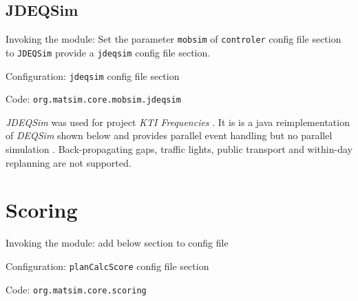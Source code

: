 \subsection{JDEQSim}
\label{sec:jdeqsim}
\begin{compactitem}
\item Invoking the module: Set the parameter \lstinline|mobsim| of \lstinline|controler| config file section to \lstinline|JDEQSim| provide a \lstinline|jdeqsim| config file section.
\item Configuration: \lstinline|jdeqsim| config file section
\item Code: \lstinline|org.matsim.core.mobsim.jdeqsim|
\end{compactitem}

\emph{JDEQSim} \citep[][]{WaraichEtAl_TechRep_IVT_2009, WaraichEtAl_STRC_2009} was used for project \emph{KTI Frequencies} \citep[][]{BalmerEtAl_ResRep_datapuls_2010}. It is is a java reimplementation of \emph{DEQSim} shown below \citep[][]{WaraichEtAl_STRC_2009, CharyparEtAl_TRR_2007, CharyparEtAl_TRB_2009} and provides parallel event handling but no parallel simulation \citep[][p.11]{BalmerEtAl_ResRep_datapuls_2010}. Back-propagating gaps, traffic lights, public transport and within-day replanning are not supported.



\section{Scoring}
\label{sec:scoring}
\begin{compactitem}
\item Invoking the module: add below section to config file
\item Configuration: \lstinline|planCalcScore| config file section
\item Code: \lstinline|org.matsim.core.scoring|
\end{compactitem}

